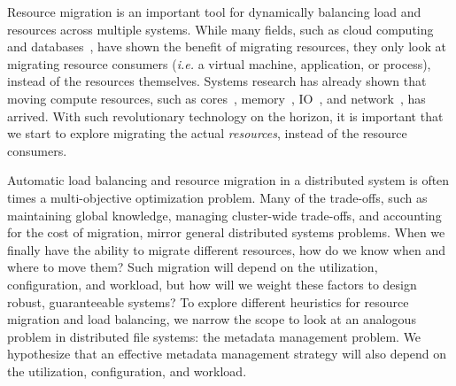 
Resource migration is an important tool for dynamically balancing load and
resources across multiple systems. While many fields, such as cloud
computing~\cite{zhang:journal2010-cloud-challenges} and
databases~\cite{elmore:sigmod2013-pythia}, have shown the benefit of migrating
resources, they only look at migrating resource consumers ({\it i.e.} a virtual
machine, application, or process), instead of the resources themselves. Systems
research has already shown that moving compute resources, such as
cores~\cite{zhang:journal2010-cloud-challenges},
memory~\cite{chapman:atc2009-vnuma}, IO~\cite{raj:hpdc2007-io-virtualization},
and network~\cite{georgiadis:atn1996-network-qos}, has arrived. With such
revolutionary technology on the horizon, it is important that we start to
explore migrating the actual {\it resources}, instead of the resource
consumers.

Automatic load balancing and resource migration in a distributed system is
often times a multi-objective optimization problem. Many of the trade-offs,
such as maintaining global knowledge, managing cluster-wide trade-offs, and
accounting for the cost of migration, mirror general distributed systems
problems. When we finally have the ability to migrate different resources, how
do we know when and where to move them? Such migration will depend on the
utilization, configuration, and workload, but how will we weight these factors
to design robust, guaranteeable systems? To explore different heuristics for
resource migration and load balancing, we narrow the scope to look at an
analogous problem in distributed file systems: the metadata management problem.
We hypothesize that an effective metadata management strategy will also depend
on the utilization, configuration, and workload. 





